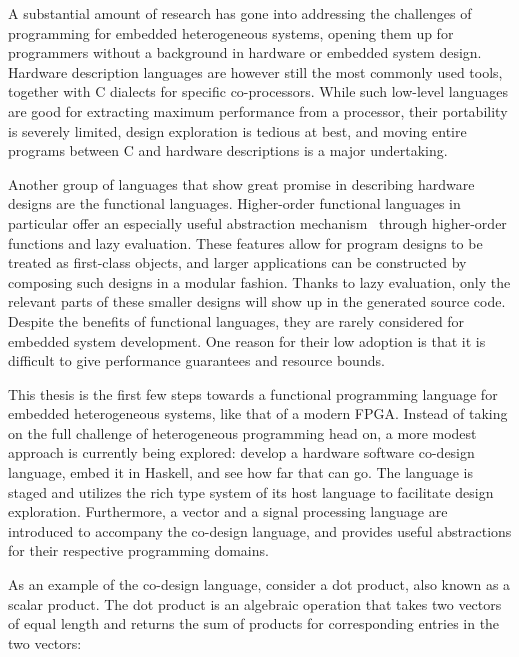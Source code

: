\documentclass[../paper.tex]{subfiles}
\begin{document}
A substantial amount of research has gone into addressing the challenges of programming for embedded heterogeneous systems, opening them up for programmers without a background in hardware or embedded system design. Hardware description languages are however still the most commonly used tools, together with C dialects for specific co-processors. While such low-level languages are good for extracting maximum performance from a processor, their portability is severely limited, design exploration is tedious at best, and moving entire programs between C and hardware descriptions is a major undertaking.

Another group of languages that show great promise in describing hardware designs are the functional languages. Higher-order functional languages in particular offer an especially useful abstraction mechanism~\cite{baaij2010, bjesse1998, gill2010} through higher-order functions and lazy evaluation. These features allow for program designs to be treated as first-class objects, and larger applications can be constructed by composing such designs in a modular fashion. Thanks to lazy evaluation, only the relevant parts of these smaller designs will show up in the generated source code. Despite the benefits of functional languages, they are rarely considered for embedded system development. One reason for their low adoption is that it is difficult to give performance guarantees and resource bounds.


This thesis is the first few steps towards a functional programming language for embedded heterogeneous systems, like that of a modern FPGA. Instead of taking on the full challenge of heterogeneous programming head on, a more modest approach is currently being explored: develop a hardware software co-design language, embed it in Haskell, and see how far that can go. The language is staged and utilizes the rich type system of its host language to facilitate design exploration. Furthermore, a vector and a signal processing language are introduced to accompany the co-design language, and provides useful abstractions for their respective programming domains.

As an example of the co-design language, consider a dot product, also known as a scalar product. The dot product is an algebraic operation that takes two vectors of equal length and returns the sum of products for corresponding entries in the two vectors:
\end{document}
